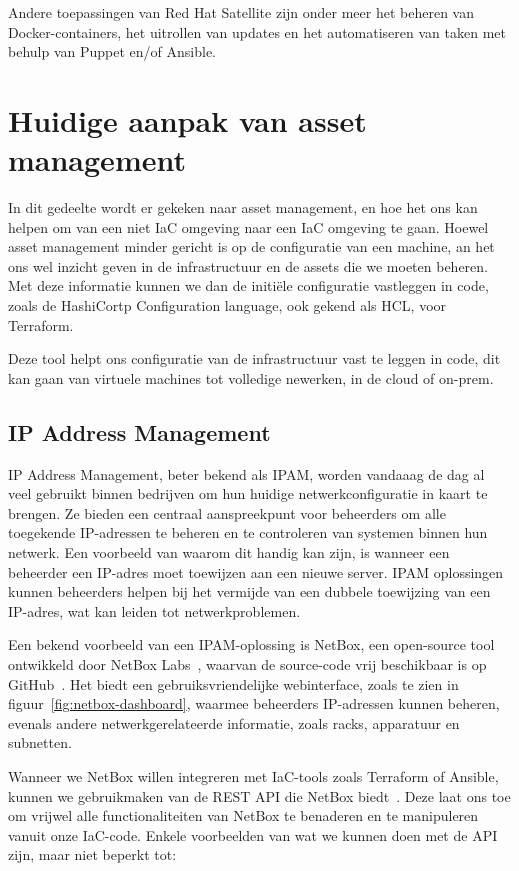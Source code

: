 Andere toepassingen van Red Hat Satellite zijn onder meer het beheren van Docker-containers, het uitrollen van updates en het automatiseren van taken met behulp van Puppet en/of Ansible.

\section{Huidige aanpak van asset management}%
\label{sec:huidige-aanpak-van-asset-management}

In dit gedeelte wordt er gekeken naar asset management, en hoe het ons kan helpen om van een niet IaC omgeving naar een IaC omgeving te gaan.
Hoewel asset management minder gericht is op de configuratie van een machine, an het ons wel inzicht geven in de infrastructuur en de assets die we moeten beheren.
Met deze informatie kunnen we dan de initi\"ele configuratie vastleggen in code, zoals de HashiCortp Configuration language, ook gekend als HCL, voor Terraform.

Deze tool helpt ons configuratie van de infrastructuur vast te leggen in code, dit kan gaan van virtuele machines tot volledige newerken, in de cloud of on-prem.

\subsection{IP Address Management}
\label{sub:ipam}

IP Address Management, beter bekend als IPAM, worden vandaaag de dag al veel gebruikt binnen bedrijven om hun huidige netwerkconfiguratie in kaart te brengen.
Ze bieden een centraal aanspreekpunt voor beheerders om alle toegekende IP-adressen te beheren en te controleren van systemen binnen hun netwerk.
Een voorbeeld van waarom dit handig kan zijn, is wanneer een beheerder een IP-adres moet toewijzen aan een nieuwe server.
IPAM oplossingen kunnen beheerders helpen bij het vermijde van een dubbele toewijzing van een IP-adres, wat kan leiden tot netwerkproblemen.

Een bekend voorbeeld van een IPAM-oplossing is NetBox, een open-source tool ontwikkeld door NetBox Labs~\autocite{netbox-ipam}, waarvan de source-code vrij beschikbaar is op GitHub~\autocite{netbox-github}.
Het biedt een gebruiksvriendelijke webinterface, zoals te zien in figuur~\ref{fig:netbox-dashboard}, waarmee beheerders IP-adressen kunnen beheren, evenals andere netwerkgerelateerde informatie, zoals racks, apparatuur en subnetten.

Wanneer we NetBox willen integreren met IaC-tools zoals Terraform of Ansible, kunnen we gebruikmaken van de REST API die NetBox biedt~\autocite{netbox-api}.
Deze laat ons toe om vrijwel alle functionaliteiten van NetBox te benaderen en te manipuleren vanuit onze IaC-code.
Enkele voorbeelden van wat we kunnen doen met de API zijn, maar niet beperkt tot:

